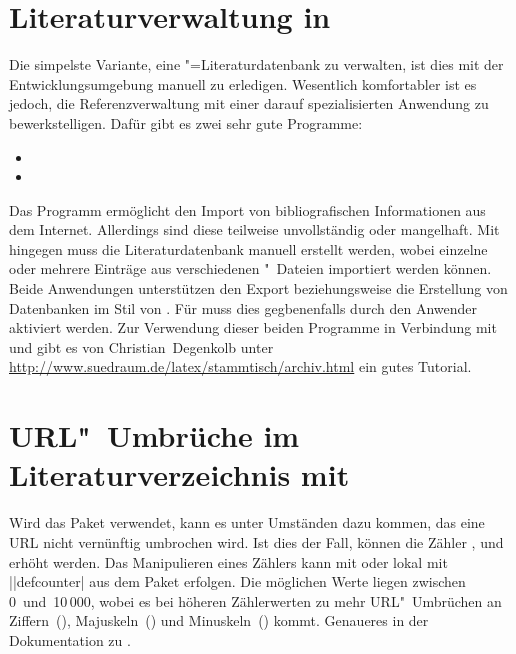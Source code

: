 \section{%
  Literaturverwaltung in %
}

%
Die simpelste Variante, eine "=Literaturdatenbank zu 
verwalten, ist dies mit der Entwicklungsumgebung manuell zu erledigen. 
Wesentlich komfortabler ist es jedoch, die Referenzverwaltung mit einer darauf 
spezialisierten Anwendung zu bewerkstelligen. Dafür gibt es zwei sehr gute 
Programme:
%
\begin{itemize}
\item {}
\item {}
\end{itemize}
%
Das Programm  ermöglicht den Import von bibliografischen 
Informationen aus dem Internet. Allerdings sind diese teilweise unvollständig 
oder mangelhaft. Mit  hingegen muss die Literaturdatenbank 
manuell erstellt werden, wobei einzelne oder mehrere Einträge aus verschiedenen
"~Dateien importiert werden können. Beide Anwendungen unterstützen 
den Export beziehungsweise die Erstellung von Datenbanken im Stil von 
. Für  muss dies gegbenenfalls durch den 
Anwender aktiviert werden. Zur Verwendung dieser beiden Programme in Verbindung 
mit  und  gibt es von Christian~Degenkolb 
unter \mbox{\url{http://www.suedraum.de/latex/stammtisch/archiv.html}} ein 
gutes Tutorial.



\section{%
  URL"~Umbrüche im Literaturverzeichnis mit %
}

%
Wird das Paket  verwendet, kann es unter Umständen dazu 
kommen, das eine URL nicht vernünftig umbrochen wird. Ist dies der Fall, 
können die Zähler ,  und 
 erhöht werden. Das Manipulieren eines Zählers kann 
mit  oder lokal mit 
\Macro||{defcounter|} aus dem Paket  erfolgen. 
Die möglichen Werte liegen zwischen 0~und~10\,000, wobei es bei höheren 
Zählerwerten zu mehr URL"~Umbrüchen an Ziffern~(), 
Majuskeln~() und Minuskeln~() 
kommt. Genaueres in der Dokumentation zu .



